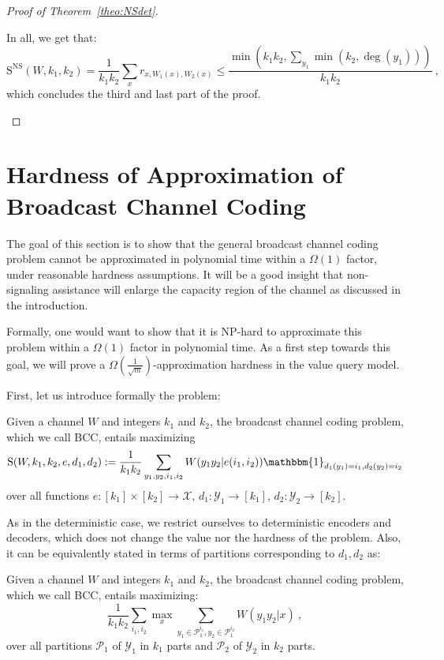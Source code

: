 \begin{proof}[Proof of Theorem~\ref{theo:NSdet}]
\begin{enumerate}
  In all, we get that:
  \[ \mathrm{S}^{\textrm{NS}}(W,k_1,k_2) = \frac{1}{k_1k_2}\sum_x r_{x,W_1(x),W_2(x)} \leq \frac{\min\left(k_1k_2,\sum_{y_1}\min(k_2,\deg(y_1))\right)}{k_1k_2} \ , \]
  which concludes the third and last part of the proof.
  \end{enumerate}
\end{proof}

\section{Hardness of Approximation of Broadcast Channel Coding}
\label{section:HardnessBC}
The goal of this section is to show that the general broadcast channel coding problem cannot be approximated in polynomial time within a $\Omega(1)$ factor, under reasonable hardness assumptions. It will be a good insight that non-signaling assistance will enlarge the capacity region of the channel as discussed in the introduction.

Formally, one would want to show that it is \textrm{NP}-hard to approximate this problem within a $\Omega(1)$ factor in polynomial time. As a first step towards this goal, we will prove a $\Omega\left(\frac{1}{\sqrt{m}}\right)$-approximation hardness in the value query model.

First, let us introduce formally the problem:
\begin{defi}
  Given a channel $W$ and integers $k_1$ and $k_2$, the broadcast channel coding problem, which we call \textsc{BCC}, entails maximizing
  \[ \mathrm{S}(W,k_1,k_2,e,d_1,d_2) := \frac{1}{k_1k_2}\sum_{y_1,y_2,i_1,i_2} W(y_1y_2|e(i_1,i_2))\mathbbm{1}_{d_1(y_1)=i_1, d_2(y_2)=i_2}\]
  over all functions $e : [k_1] \times [k_2] \rightarrow \mathcal{X}$, $d_1 : \mathcal{Y}_1 \rightarrow [k_1]$,  $d_2 : \mathcal{Y}_2 \rightarrow [k_2]$.
\end{defi}

As in the deterministic case, we restrict ourselves to deterministic encoders and decoders, which does not change the value nor the hardness of the problem. Also, it can be equivalently stated in terms of partitions corresponding to $d_1,d_2$ as:
\begin{prop}
  Given a channel $W$ and integers $k_1$ and $k_2$, the broadcast channel coding problem, which we call \textsc{BCC}, entails maximizing:
  \[ \frac{1}{k_1k_2}\sum_{i_1,i_2} \max_x \sum_{y_1 \in \mathcal{P}_1^{i_1}, y_2 \in \mathcal{P}_1^{i_2}} W(y_1y_2|x) \ , \]
  over all partitions $\mathcal{P}_1$ of $\mathcal{Y}_1$ in $k_1$ parts and $\mathcal{P}_2$ of $\mathcal{Y}_2$ in $k_2$ parts.
\end{prop}


